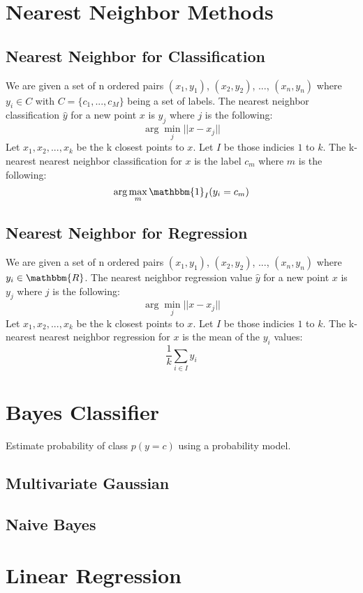 \documentclass[twoside,11pt]{article}
\theoremstyle{definition}
\begin{document}
\section{Nearest Neighbor Methods}

\subsection{Nearest Neighbor for Classification}

We are given a set of n ordered pairs $(x_1,y_1)$, $(x_2,y_2)$, ..., $(x_n,y_n)$ where $y_i \in C$ with $C=\{ c_1, ..., c_M \}$ being a set of labels. The nearest neighbor classification $\hat{y}$ for a new point $x$ is $y_j$ where $j$ is the following:
\[
\arg \min_j||x-x_j||
\]
Let $x_1,x_2,...,x_k$ be the k closest points to $x$. Let $I$ be those indicies $1$ to $k$. The k-nearest nearest neighbor classification for $x$ is the label $c_m$ where $m$ is the following:
\[
\arg \max_m \mathbbm{1}_{I}{(y_i=c_m)}
\]

\subsection{Nearest Neighbor for Regression}

We are given a set of n ordered pairs $(x_1,y_1)$, $(x_2,y_2)$, ..., $(x_n,y_n)$ where $y_i \in \mathbbm{R}$. The nearest neighbor regression value $\hat{y}$ for a new point $x$ is $y_j$ where $j$ is the following:
\[
\arg \min_j||x-x_j||
\]
Let $x_1,x_2,...,x_k$ be the k closest points to $x$. Let $I$ be those indicies $1$ to $k$. The k-nearest nearest neighbor regression for $x$ is the mean of the $y_i$ values:
\[
\frac{1}{k} \sum_{i \in I} y_i
\]

\section{Bayes Classifier}

Estimate probability of class $p(y=c)$ using a probability model. 

\subsection{Multivariate Gaussian}

\subsection{Naive Bayes}
\newpage
\section{Linear Regression}
\end{document}
